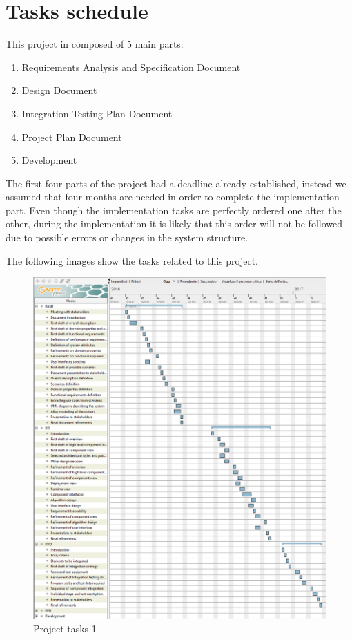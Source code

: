 \section{Tasks schedule}

This project in composed of 5 main parts:

\begin{enumerate}
	\item Requirements Analysis and Specification Document
	\item Design Document
	\item Integration Testing Plan Document
	\item Project Plan Document
	\item Development
\end{enumerate}

The first four parts of the project had a deadline already established, instead
we assumed that four months are needed in order to complete the implementation
part. Even though the implementation tasks are perfectly ordered one after the
other, during the implementation it is likely that this order will not be
followed due to possible errors or changes in the system structure.

The following images show the tasks related to this project.

\begin{figure}[H]
	\centerline{
		\includegraphics[width=500px]{../Datas/images/tasks-schedule-1.png}
	}
	\caption{Project tasks 1}
		\label{fig:tasks-1}
\end{figure}

